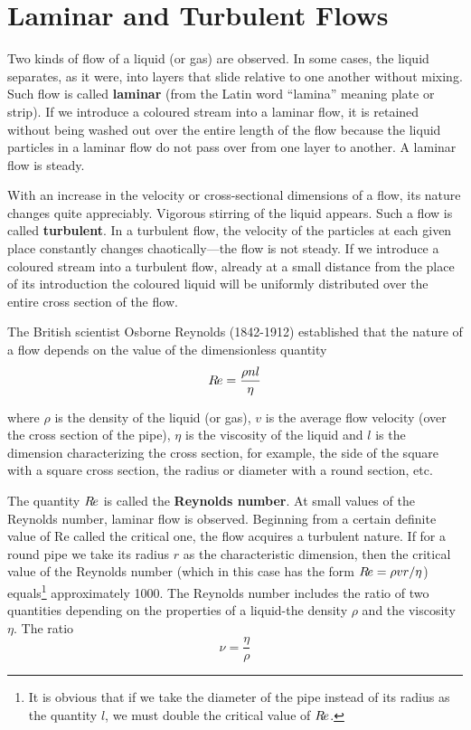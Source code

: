 \section{Laminar and Turbulent Flows}\label{sec:9_5}

Two kinds of flow of a liquid (or gas) are observed. In some cases, the liquid separates, as it were, into layers that slide relative to one another without mixing. Such flow is called \textbf{laminar} (from the Latin word ``lamina'' meaning plate or strip). If we introduce a coloured stream into a laminar flow, it is retained without being washed out over the entire length of the flow because the liquid particles in a laminar flow do not pass over from one layer to another. A laminar flow is steady.

With an increase in the velocity or cross-sectional dimensions of a flow, its nature changes quite appreciably. Vigorous stirring of the liquid appears. Such a flow is called \textbf{turbulent}. In a turbulent flow, the velocity of the particles at each given place constantly changes chaotically---the flow is not steady. If we introduce a coloured stream into a turbulent flow, already at a small distance from the place of its introduction the coloured liquid will be uniformly distributed over the entire cross section of the flow.

The British scientist Osborne Reynolds (1842-1912) established that the nature of a flow depends on the value of the dimensionless quantity
\begin{equation}\label{eq:9_13}
	R\hspace{-1pt}e = \frac{\rho n l}{\eta}
\end{equation}

\noindent
where $\rho$ is the density of the liquid (or gas), $v$ is the average flow velocity (over the cross section of the pipe), $\eta$ is the viscosity of the liquid and $l$ is the dimension characterizing the cross section, for example, the side of the square with a square cross section, the radius or diameter with a round section, etc.

The quantity $R\hspace{-1pt}e$ is called the \textbf{Reynolds number}. At small values of the Reynolds number, laminar flow is observed. Beginning from a certain definite value of Re called the critical one, the flow acquires a turbulent nature. If for a round pipe we take its radius $r$ as the characteristic dimension, then the critical value of the Reynolds number (which in this case has the form $R\hspace{-1pt}e=\rho vr/\eta$) equals\footnote{It is obvious that if we take the diameter of the pipe instead of its radius as the quantity $l$, we must double the critical value of $R\hspace{-1pt}e$.} approximately \num{1000}. The Reynolds number includes the ratio of two quantities depending on the properties of a liquid-the density $\rho$ and the viscosity $\eta$. The ratio
\begin{equation}\label{eq:9_14}
	\nu = \frac{\eta}{\rho}
\end{equation}

